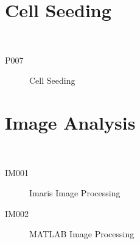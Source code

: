 


\section{Cell Seeding}
\HRule\\[2in]
\label{app:cell}

\begin{description}
  \item[P007] Cell Seeding
\end{description}



\section{Image Analysis}

\HRule\\[2in]

\begin{description}
  \item[IM001] Imaris Image Processing
  \item[IM002] MATLAB Image Processing
\end{description}




